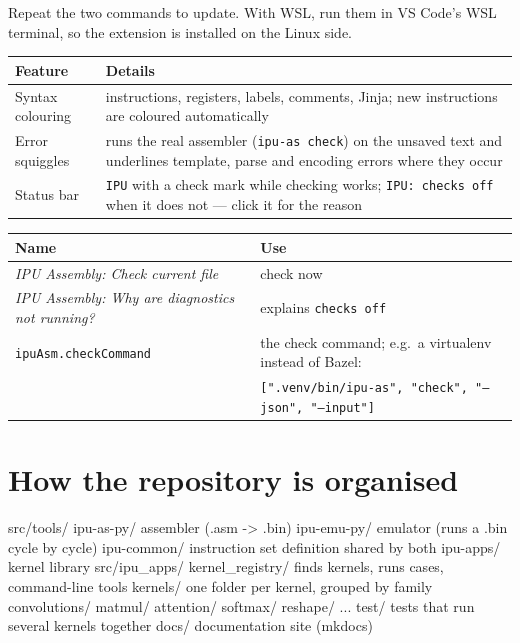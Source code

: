 \documentclass[11pt,a4paper]{article}
\begin{document}
Repeat the two commands to update. With WSL, run them in VS Code's WSL
terminal, so the extension is installed on the Linux side.

\begin{center}
\begin{tabularx}{\linewidth}{lX}
\toprule
Feature & Details \\
\midrule
Syntax colouring & instructions, registers, labels, comments, Jinja; new instructions are coloured automatically \\
Error squiggles & runs the real assembler (\texttt{ipu-as check}) on the unsaved text and underlines template, parse and encoding errors where they occur \\
Status bar & \texttt{IPU} with a check mark while checking works; \texttt{IPU: checks off} when it does not --- click it for the reason \\
\bottomrule
\end{tabularx}
\end{center}

\begin{center}
\begin{tabularx}{\linewidth}{lX}
\toprule
Name & Use \\
\midrule
\textit{IPU Assembly: Check current file} & check now \\
\textit{IPU Assembly: Why are diagnostics not running?} & explains \texttt{checks off} \\
\texttt{ipuAsm.checkCommand} & the check command; e.g.\ a virtualenv instead of Bazel: \\
 & \texttt{[".venv/bin/ipu-as", "check", "--json", "--input"]} \\
\bottomrule
\end{tabularx}
\end{center}

\section{How the repository is organised}

\begin{filetree}
src/tools/
  ipu-as-py/             assembler (.asm -> .bin)
  ipu-emu-py/            emulator (runs a .bin cycle by cycle)
  ipu-common/            instruction set definition shared by both
  ipu-apps/              kernel library
    src/ipu_apps/
      kernel_registry/   finds kernels, runs cases, command-line tools
      kernels/           one folder per kernel, grouped by family
        convolutions/  matmul/  attention/  softmax/  reshape/  ...
    test/                tests that run several kernels together
docs/                    documentation site (mkdocs)
\end{filetree}
\end{document}
